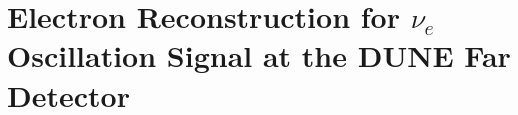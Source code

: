 
\chapter{Electron Reconstruction for $\nu_e$ Oscillation Signal at the DUNE Far Detector}\label{chap:FDAnalysis}
